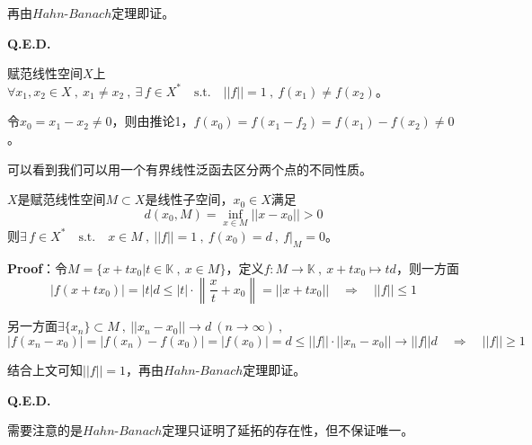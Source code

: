 再由$Hahn$-$Banach$定理即证。

\textbf{Q.E.D.}
\begin{proposition}
    赋范线性空间$X$上$\forall x_1,x_2 \in X \ , \ x_1 \neq x_2 \ , \ \exists \, f \in X^* \quad \text{s.t.} \quad ||f||=1 \ , \ f(x_1) \neq f(x_2)$。
\end{proposition}
令$x_0=x_1-x_2 \neq 0$，则由推论1，$f(x_0)=f(x_1-f_2)=f(x_1)-f(x_2) \neq 0$。

可以看到我们可以用一个有界线性泛函去区分两个点的不同性质。
\begin{proposition}
    $X$是赋范线性空间$M \subset X$是线性子空间，$x_0 \in X$满足
    \[d(x_0,M)=\inf_{x \in M}||x-x_0||>0\]
    则$\exists \, f \in X^* \quad \text{s.t.} \quad x \in M \ , \ ||f||=1 \ , \ f(x_0)=d \ , \ f|_M=0$。
\end{proposition}
\textbf{Proof}：令$M=\{x+tx_0|t \in \mathbb{K} \ , \ x \in M\}$，定义$f:M \to \mathbb{K} \ , \ x+tx_0 \mapsto td$，则一方面
\[|f(x+tx_0)|=|t|d \leq |t| \cdot \left\|\frac{x}{t}+x_0\right\|=||x+tx_0|| \quad \Rightarrow \quad ||f|| \leq 1\]

另一方面$\exists \{x_n\} \subset M \ , \ ||x_n -x_0|| \to d \ (n \to \infty) \ ,$
\[|f(x_n-x_0)|=|f(x_n)-f(x_0)|=|f(x_0)|=d \leq ||f|| \cdot ||x_n-x_0|| \to ||f||d \quad \Rightarrow \quad ||f|| \geq 1\]

结合上文可知$||f||=1$，再由$Hahn$-$Banach$定理即证。

\textbf{Q.E.D.}

需要注意的是$Hahn$-$Banach$定理只证明了延拓的存在性，但不保证唯一。
